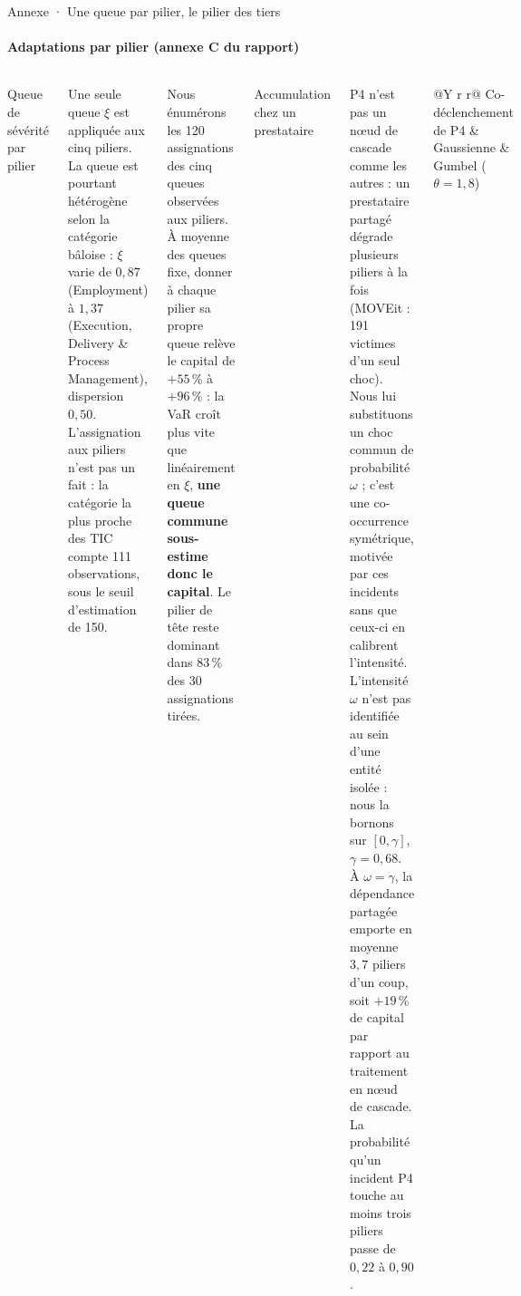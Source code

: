 \documentclass[aspectratio=169,10pt,t]{beamer}
\renewcommand{\arraystretch}{1.25}
\begin{document}
\begin{frame}{Annexe · Une queue par pilier, le pilier des tiers}
  \suivimethode{}{}
  \framesubtitle{Adaptations par pilier (annexe C du rapport)}
  \begin{columns}[T,onlytextwidth]
    \scriptsize
    {\editorial\normalsize Queue de sévérité par pilier}\par\vspace{1mm}
    Une seule queue $\xi$ est appliquée aux cinq piliers. La queue est pourtant hétérogène selon la catégorie bâloise : $\xi$ varie de $0{,}87$ (Employment) à $1{,}37$ (Execution, Delivery \& Process Management), dispersion $0{,}50$. L'assignation aux piliers n'est pas un fait : la catégorie la plus proche des TIC compte 111 observations, sous le seuil d'estimation de 150.\par\vspace{1mm}
    Nous énumérons les 120 assignations des cinq queues observées aux piliers. À moyenne des queues fixe, donner à chaque pilier sa propre queue relève le capital de $+55\,\%$ à $+96\,\%$ : la VaR croît plus vite que linéairement en $\xi$, \textbf{une queue commune sous-estime donc le capital}. Le pilier de tête reste dominant dans $83\,\%$ des 30 assignations tirées.\par\vspace{2mm}
    {\editorial\normalsize Accumulation chez un prestataire}\par\vspace{1mm}
    P4 n'est pas un nœud de cascade comme les autres : un prestataire partagé dégrade plusieurs piliers à la fois (MOVEit : 191 victimes d'un seul choc). Nous lui substituons un choc commun de probabilité $\omega$ ; c'est une co-occurrence symétrique, motivée par ces incidents sans que ceux-ci en calibrent l'intensité.
    \scriptsize
    L'intensité $\omega$ n'est pas identifiée au sein d'une entité isolée : nous la bornons sur $[0,\gamma]$, $\gamma=0{,}68$. À $\omega=\gamma$, la dépendance partagée emporte en moyenne $3{,}7$ piliers d'un coup, soit $+19\,\%$ de capital par rapport au traitement en nœud de cascade. La probabilité qu'un incident P4 touche au moins trois piliers passe de $0{,}22$ à $0{,}90$.\par\vspace{1.5mm}
    \renewcommand{\arraystretch}{1.12}
    \begin{tabularx}{\linewidth}{@{}Y r r@{}}
      \toprule
      Co-déclenchement de P4 & Gaussienne & Gumbel ($\theta=1{,}8$) \\

\end{tabularx}
\end{columns}
\end{frame}
\end{document}
